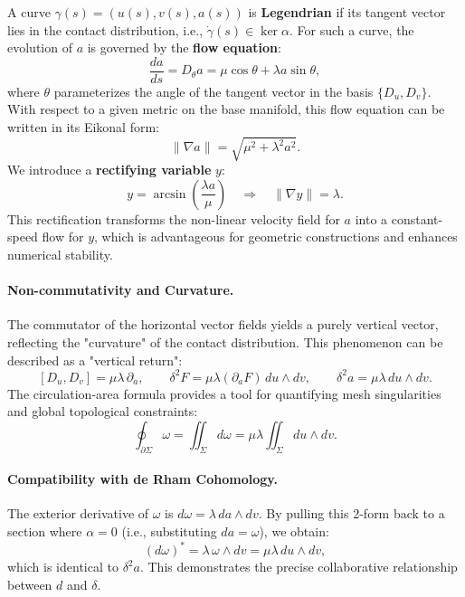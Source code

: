 A curve $\gamma(s) = (u(s), v(s), a(s))$ is \textbf{Legendrian} if its tangent vector lies in the contact distribution, i.e., $\dot\gamma(s) \in \ker\alpha$. For such a curve, the evolution of $a$ is governed by the \textbf{flow equation}:
\begin{equation}\label{eq:4}\tag{4}
\frac{da}{ds} = D_\theta a = \mu\cos\theta + \lambda a\sin\theta,
\end{equation}
where $\theta$ parameterizes the angle of the tangent vector in the basis $\{D_u,D_v\}$. With respect to a given metric on the base manifold, this flow equation can be written in its Eikonal form:
\begin{equation}\label{eq:5}\tag{5}
\|\nabla a\| = \sqrt{\mu^2 + \lambda^2 a^2}.
\end{equation}
We introduce a \textbf{rectifying variable} $y$:
\begin{equation}\label{eq:6}\tag{6}
y = \arcsin\left(\frac{\lambda a}{\mu}\right) \quad\Rightarrow\quad \|\nabla y\| = \lambda.
\end{equation}
This rectification transforms the non-linear velocity field for $a$ into a constant-speed flow for $y$, which is advantageous for geometric constructions and enhances numerical stability.

\paragraph{Non-commutativity and Curvature.}
The commutator of the horizontal vector fields yields a purely vertical vector, reflecting the "curvature" of the contact distribution. This phenomenon can be described as a "vertical return":
\begin{equation}\label{eq:7}\tag{7}
[D_u,D_v] = \mu\lambda\,\partial_a,\qquad \delta^2F = \mu\lambda(\partial_a F)\,du\wedge dv,\qquad \delta^2 a = \mu\lambda\,du\wedge dv.
\end{equation}
The circulation-area formula provides a tool for quantifying mesh singularities and global topological constraints:
\begin{equation}\label{eq:8}\tag{8}
\oint_{\partial\Sigma}\omega = \iint_\Sigma d\omega = \mu\lambda\iint_\Sigma du\wedge dv.
\end{equation}

\paragraph{Compatibility with de Rham Cohomology.}
The exterior derivative of $\omega$ is $d\omega = \lambda\,da\wedge dv$. By pulling this 2-form back to a section where $\alpha=0$ (i.e., substituting $da=\omega$), we obtain:
\[
(d\omega)^* = \lambda\,\omega\wedge dv = \mu\lambda\,du\wedge dv,
\]
which is identical to $\delta^2 a$. This demonstrates the precise collaborative relationship between $d$ and $\delta$.

